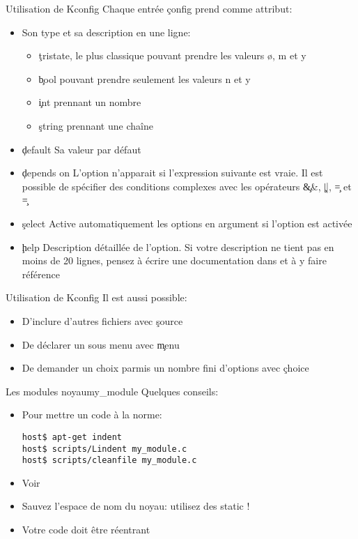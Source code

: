 \begin{frame}[fragile=singleslide]{Utilisation de Kconfig}
  Chaque entrée \c{config} prend comme attribut:
  \begin{itemize}
  \item Son type et sa description en une ligne:
    \begin{itemize}
    \item \c{tristate}, le plus  classique pouvant prendre les valeurs
     ø, m et y
    \item \c{bool} pouvant prendre seulement les valeurs n et y
    \item \c{int} prennant un nombre
    \item \c{string} prennant une chaîne
    \end{itemize}
  \item \c{default} Sa valeur par défaut
  \item  \c{depends on} L'option  n'apparait si  l'expression suivante
    est vraie.  Il est possible de spécifier  des conditions complexes
    avec les opérateurs \c{&&}, \c{||}, \c{=} et \c{\!=}
  \item \c{select}  Active automatiquement les options  en argument si
    l'option est activée
  \item   \c{help}  Description   détaillée  de   l'option.   Si  votre
    description ne  tient pas en moins  de 20 lignes,  pensez à écrire
    une documentation dans  et à y faire référence
  \end{itemize}
\end{frame}

\begin{frame}[fragile=singleslide]{Utilisation de Kconfig}
  Il est aussi possible:
  \begin{itemize}
  \item D'inclure d'autres fichiers avec \c{source}
  \item De déclarer un sous menu avec \c{menu}
  \item  De demander  un choix  parmis un  nombre fini  d'options avec
    \c{choice}
  \end{itemize}
\end{frame}

\begin{frame}[fragile=singleslide]{Les modules noyau}{my\_module}
  Quelques conseils:
  \begin{itemize}
  \item  Pour mettre un code à la norme:
    \begin{lstlisting}
host$ apt-get indent
host$ scripts/Lindent my_module.c
host$ scripts/cleanfile my_module.c
    \end{lstlisting} %
  \item Voir 
  \item Sauvez l'espace de nom du noyau: utilisez des static !
  \item Votre code doit être réentrant
  \end{itemize}
\end{frame}

